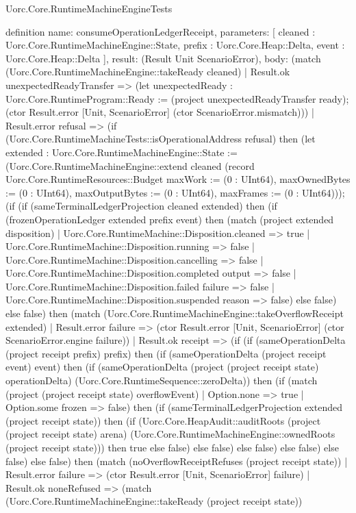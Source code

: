 \begin{lexlean}{Uorc.Core.RuntimeMachineEngineTests}
\begin{semanticmodule}
definition{
  name: consumeOperationLedgerReceipt,
  parameters: [
    cleaned : Uorc.Core.RuntimeMachineEngine::State,
    prefix : Uorc.Core.Heap::Delta,
    event : Uorc.Core.Heap::Delta
  ],
  result: (Result Unit ScenarioError),
  body: (match (Uorc.Core.RuntimeMachineEngine::takeReady cleaned)
    | Result.ok unexpectedReadyTransfer => (let unexpectedReady : Uorc.Core.RuntimeProgram::Ready := (project unexpectedReadyTransfer ready); (ctor Result.error [Unit, ScenarioError] (ctor ScenarioError.mismatch)))
    | Result.error refusal => (if (Uorc.Core.RuntimeMachineTests::isOperationalAddress refusal) then (let extended : Uorc.Core.RuntimeMachineEngine::State := (Uorc.Core.RuntimeMachineEngine::extend cleaned (record Uorc.Core.RuntimeResources::Budget {maxWork := (0 : UInt64), maxOwnedBytes := (0 : UInt64), maxOutputBytes := (0 : UInt64), maxFrames := (0 : UInt64)})); (if (if (sameTerminalLedgerProjection cleaned extended) then (if (frozenOperationLedger extended prefix event) then (match (project extended disposition)
      | Uorc.Core.RuntimeMachine::Disposition.cleaned => true
      | Uorc.Core.RuntimeMachine::Disposition.running => false
      | Uorc.Core.RuntimeMachine::Disposition.cancelling => false
      | Uorc.Core.RuntimeMachine::Disposition.completed output => false
      | Uorc.Core.RuntimeMachine::Disposition.failed failure => false
      | Uorc.Core.RuntimeMachine::Disposition.suspended reason => false) else false) else false) then (match (Uorc.Core.RuntimeMachineEngine::takeOverflowReceipt extended)
      | Result.error failure => (ctor Result.error [Unit, ScenarioError] (ctor ScenarioError.engine failure))
      | Result.ok receipt => (if (if (sameOperationDelta (project receipt prefix) prefix) then (if (sameOperationDelta (project receipt event) event) then (if (sameOperationDelta (project (project receipt state) operationDelta) (Uorc.Core.RuntimeSequence::zeroDelta)) then (if (match (project (project receipt state) overflowEvent)
        | Option.none => true
        | Option.some frozen => false) then (if (sameTerminalLedgerProjection extended (project receipt state)) then (if (Uorc.Core.HeapAudit::auditRoots (project (project receipt state) arena) (Uorc.Core.RuntimeMachineEngine::ownedRoots (project receipt state))) then true else false) else false) else false) else false) else false) else false) then (match (noOverflowReceiptRefuses (project receipt state))
        | Result.error failure => (ctor Result.error [Unit, ScenarioError] failure)
        | Result.ok noneRefused => (match (Uorc.Core.RuntimeMachineEngine::takeReady (project receipt state))
}
\end{semanticmodule}
\end{lexlean}

